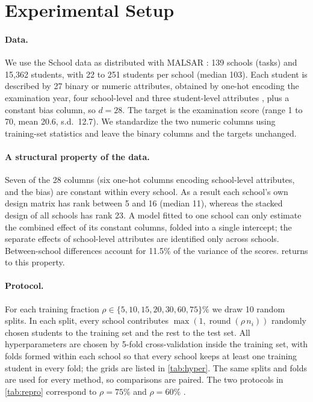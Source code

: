 \section{Experimental Setup}
\label{sec:setup}

\paragraph{Data.}
We use the School data as distributed with MALSAR \citep{zhou2011malsar}: 139 schools (tasks) and 15,362 students, with 22 to 251 students per school (median 103). Each student is described by 27 binary or numeric attributes, obtained by one-hot encoding the examination year, four school-level and three student-level attributes \citep{argyriou2008convex}, plus a constant bias column, so $d = 28$. The target is the examination score (range 1 to 70, mean 20.6, s.d.\ 12.7). We standardize the two numeric columns using training-set statistics and leave the binary columns and the targets unchanged.

\paragraph{A structural property of the data.}
Seven of the 28 columns (six one-hot columns encoding school-level attributes, and the bias) are constant within every school. As a result each school's own design matrix has rank between 5 and 16 (median 11), whereas the stacked design of all schools has rank 23. A model fitted to one school can only estimate the combined effect of its constant columns, folded into a single intercept; the separate effects of school-level attributes are identified only across schools. Between-school differences account for 11.5\% of the variance of the scores.  returns to this property.

\paragraph{Protocol.}
For each training fraction $\rho \in \{5, 10, 15, 20, 30, 60, 75\}\%$ we draw 10 random splits. In each split, every school contributes $\max(1, \operatorname{round}(\rho\, n_i))$ randomly chosen students to the training set and the rest to the test set. All hyperparameters are chosen by 5-fold cross-validation inside the training set, with folds formed within each school so that every school keeps at least one training student in every fold; the grids are listed in \cref{tab:hyper}. The same splits and folds are used for every method, so comparisons are paired. The two protocols in \cref{tab:repro} correspond to $\rho = 75\%$ \citep{argyriou2008convex, zhang2010convex} and $\rho = 60\%$ \citep{kumar2012learning}.

